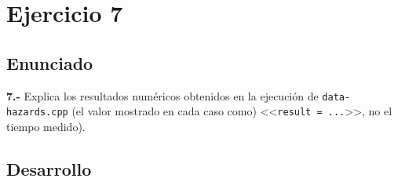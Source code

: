 \section{Ejercicio 7}
\subsection{Enunciado}
\begin{ejer}
    \textbf{7.-} Explica los resultados numéricos obtenidos en la ejecución de \texttt{data-hazards.cpp} 
    (el valor mostrado en cada caso como) <<\texttt{result = ...}>>, no el tiempo medido).
\end{ejer}
\subsection{Desarrollo}
